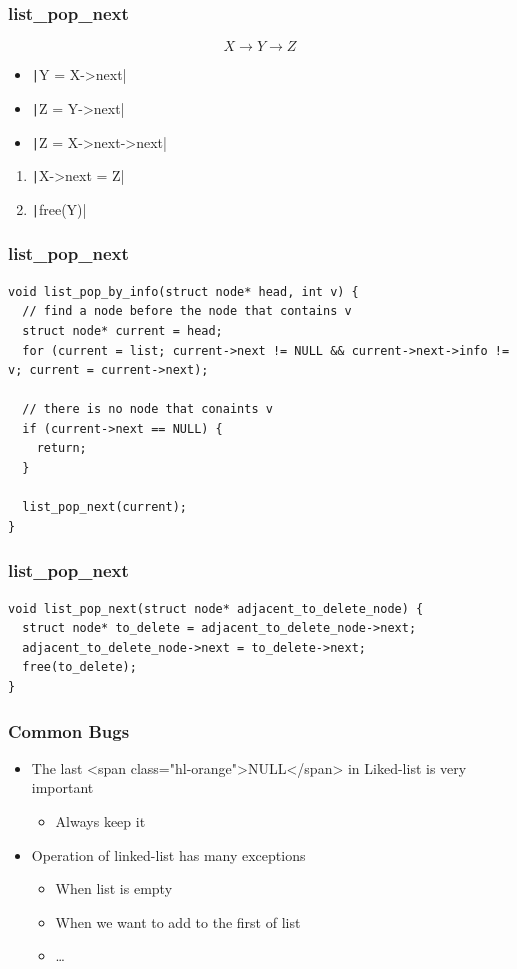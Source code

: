 \documentclass{../c-lecture}
\begin{document}
\begin{frame}[fragile]
  \frametitle{list\_pop\_next}
  \[X \rightarrow Y \rightarrow Z\]
  \begin{itemize}
    \item \texttt|Y = X->next|
    \item \texttt|Z = Y->next|
    \item \texttt|Z = X->next->next|
  \end{itemize}
  \begin{enumerate}
    \item \texttt|X->next = Z|
    \item \texttt|free(Y)|
  \end{enumerate}
\end{frame}
\begin{frame}[fragile]
  \frametitle{list\_pop\_next}
  \begin{verbatim}
void list_pop_by_info(struct node* head, int v) {
  // find a node before the node that contains v
  struct node* current = head;
  for (current = list; current->next != NULL && current->next->info != v; current = current->next);

  // there is no node that conaints v
  if (current->next == NULL) {
    return;
  }

  list_pop_next(current);
}
  \end{verbatim}
\end{frame}
\begin{frame}[fragile]
  \frametitle{list\_pop\_next}
  \begin{verbatim}
void list_pop_next(struct node* adjacent_to_delete_node) {
  struct node* to_delete = adjacent_to_delete_node->next;
  adjacent_to_delete_node->next = to_delete->next;
  free(to_delete);
}
  \end{verbatim}
\end{frame}

\begin{frame}
  \frametitle{Common Bugs}
  \begin{itemize}
    \item
      The last <span class="hl-orange">NULL</span> in Liked-list is very
      important

    \begin{itemize}
      \item Always keep it
    \end{itemize}
    \item Operation of linked-list has many exceptions
    \begin{itemize}
      \item When list is empty
      \item When we want to add to the first of list
      \item \ldots
    \end{itemize}
  \end{itemize}
\end{frame}
\end{document}
